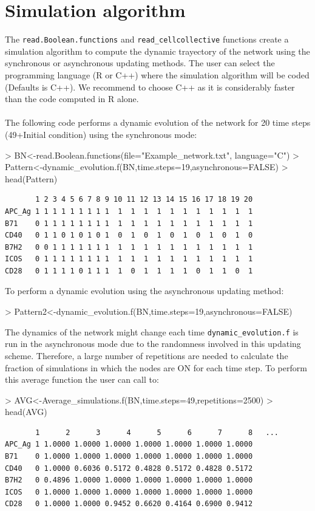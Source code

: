 \documentclass[a4paper]{article}
\begin{document}
\section{Simulation algorithm}
The \texttt{read.Boolean.functions} and \texttt{read\_cellcollective} functions create a simulation algorithm to compute the dynamic trayectory of the network using the synchronous or asynchronous updating methods. The user can select the programming language (R or C++) where the simulation algorithm will be coded (Defaults is C++). We recommend to choose C++ as it is considerably faster than the code computed in R alone.\\
\\
The following code performs a dynamic evolution of the network for 20 time steps (49+Initial condition) using the synchronous mode:
\begin{Schunk}
\begin{Sinput}
> BN<-read.Boolean.functions(file="Example_network.txt", language="C")
> Pattern<-dynamic_evolution.f(BN,time.steps=19,asynchronous=FALSE)
> head(Pattern)
\end{Sinput}
\end{Schunk}
\begin{verbatim}
       1 2 3 4 5 6 7 8 9 10 11 12 13 14 15 16 17 18 19 20
APC_Ag 1 1 1 1 1 1 1 1 1  1  1  1  1  1  1  1  1  1  1  1
B71    0 1 1 1 1 1 1 1 1  1  1  1  1  1  1  1  1  1  1  1
CD40   0 1 1 0 1 0 1 0 1  0  1  0  1  0  1  0  1  0  1  0
B7H2   0 0 1 1 1 1 1 1 1  1  1  1  1  1  1  1  1  1  1  1
ICOS   0 1 1 1 1 1 1 1 1  1  1  1  1  1  1  1  1  1  1  1
CD28   0 1 1 1 1 0 1 1 1  1  0  1  1  1  1  0  1  1  0  1
\end{verbatim}

To perform a dynamic evolution using the asynchronous updating method:
\begin{Schunk}
\begin{Sinput}
> Pattern2<-dynamic_evolution.f(BN,time.steps=19,asynchronous=FALSE)
\end{Sinput}
\end{Schunk}

The dynamics of the network might change each time \texttt{dynamic\_evolution.f} is run in the asynchronous mode  due to the randomness involved in this updating scheme. Therefore, a large number of repetitions are needed to calculate the fraction of simulations in which the nodes are ON for each time step. To perform this average function the user can call to:
\begin{Schunk}
\begin{Sinput}
> AVG<-Average_simulations.f(BN,time.steps=49,repetitions=2500)
> head(AVG)
\end{Sinput}
\end{Schunk}
\begin{verbatim}
       1      2      3      4      5      6      7      8   ...
APC_Ag 1 1.0000 1.0000 1.0000 1.0000 1.0000 1.0000 1.0000
B71    0 1.0000 1.0000 1.0000 1.0000 1.0000 1.0000 1.0000
CD40   0 1.0000 0.6036 0.5172 0.4828 0.5172 0.4828 0.5172
B7H2   0 0.4896 1.0000 1.0000 1.0000 1.0000 1.0000 1.0000
ICOS   0 1.0000 1.0000 1.0000 1.0000 1.0000 1.0000 1.0000
CD28   0 1.0000 1.0000 0.9452 0.6620 0.4164 0.6900 0.9412
\end{verbatim}
\end{document}
